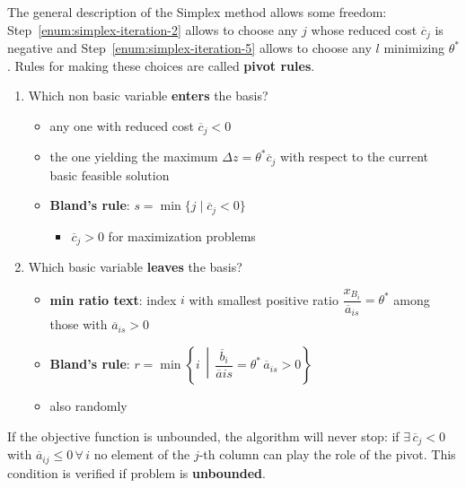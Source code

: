 \documentclass[english]{article}
\begin{document}
\bigskip
The general description of the Simplex method allows some freedom:
Step~\ref{enum:simplex-iteration-2} allows to choose any \(j\) whose reduced cost \(\overline{c}_j\) is negative and Step~\ref{enum:simplex-iteration-5} allows to choose any \(l\) minimizing \(\theta^\ast\).
Rules for making these choices are called \textbf{pivot rules}.

\begin{enumerate}
  \item Which non basic variable \textbf{enters} the basis?
        \begin{itemize}
          \item any one with reduced cost \(\overline{c}_j < 0\)
          \item the one yielding the maximum \(\Delta z = \theta^\ast \overline{c}_j\) with respect to the current basic feasible solution
          \item \textbf{Bland's rule}: \(s = \min \{ j \mid \overline{c}_j < 0 \}\)
                \begin{itemize}[label=\(\rightarrow\)]
                  \item \(\overline{c}_j > 0\) for maximization problems
                \end{itemize}
        \end{itemize}
  \item Which basic variable \textbf{leaves} the basis?
        \begin{itemize}
          \item \textbf{min ratio text}: index \(i\) with smallest positive ratio \(\dfrac{x_{B_i}}{\overline{a}_{is}} = \theta^\ast\) among those with \(\overline{a}_{is} > 0\)
          \item \textbf{Bland's rule}: \(r = \min \left\{ i \,\middle\vert\, \dfrac{\overline{b}_i}{\overline{a}{is}} = \theta^\ast \, \overline{a}_{is} > 0 \right\}\)
          \item also randomly
        \end{itemize}
\end{enumerate}

\bigskip
\begin{property}[Unboundedness]
  If the objective function is unbounded, the algorithm will never stop: if \(\exists \, \overline{c}_j < 0\) with \(\overline{a}_{ij} \leq 0 \, \forall \, i\) no element of the \(j\)-th column can play the role of the pivot.
  This condition is verified if problem is \textbf{unbounded}.
\end{property}
\end{document}
